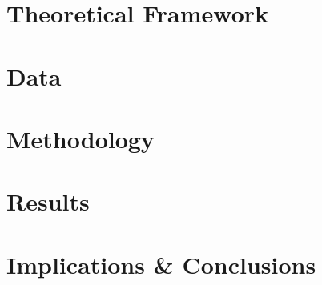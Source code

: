 \documentclass[%
 reprint,
 amsmath,amssymb,
 aps,
]{revtex4-2}
\begin{document}
\section{Theoretical Framework}\label{Theory}

\section{Data}\label{Data}


\section{Methodology}\label{Method}


\section{Results}\label{Result}


\section{Implications \& Conclusions}\label{Concl}







\nocite{*}

\end{document}
